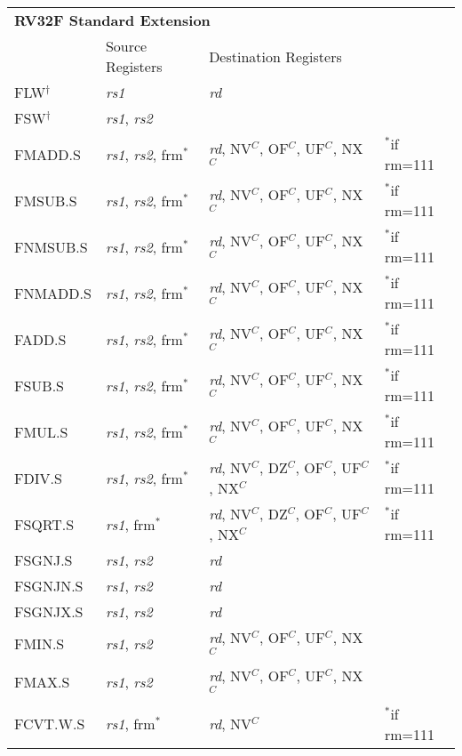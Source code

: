 \begin{tabular}{p{25mm}|p{3cm}|p{6cm}|p{10cm}}
  \multicolumn{4}{l}{\bf RV32F Standard Extension} \\
  \cline{2-3}
   & Source Registers & Destination Registers \\
  \cline{2-3}
   FLW$^\dagger$ & {\em rs1} & {\em rd} &  \\
   \cline{2-3}
   FSW$^\dagger$ & {\em rs1}, {\em rs2} &  &  \\
   \cline{2-3}
   FMADD.S & {\em rs1}, {\em rs2}, frm$^*$ & {\em rd}, NV$^C$, OF$^C$, UF$^C$, NX$^C$ & $^*$if rm=111 \\
   \cline{2-3}
   FMSUB.S & {\em rs1}, {\em rs2}, frm$^*$ & {\em rd}, NV$^C$, OF$^C$, UF$^C$, NX$^C$ & $^*$if rm=111 \\
   \cline{2-3}
   FNMSUB.S & {\em rs1}, {\em rs2}, frm$^*$ & {\em rd}, NV$^C$, OF$^C$, UF$^C$, NX$^C$ & $^*$if rm=111 \\
   \cline{2-3}
   FNMADD.S & {\em rs1}, {\em rs2}, frm$^*$ & {\em rd}, NV$^C$, OF$^C$, UF$^C$, NX$^C$ & $^*$if rm=111 \\
   \cline{2-3}
   FADD.S & {\em rs1}, {\em rs2}, frm$^*$ & {\em rd}, NV$^C$, OF$^C$, UF$^C$, NX$^C$ & $^*$if rm=111 \\
   \cline{2-3}
   FSUB.S & {\em rs1}, {\em rs2}, frm$^*$ & {\em rd}, NV$^C$, OF$^C$, UF$^C$, NX$^C$ & $^*$if rm=111 \\
   \cline{2-3}
   FMUL.S & {\em rs1}, {\em rs2}, frm$^*$ & {\em rd}, NV$^C$, OF$^C$, UF$^C$, NX$^C$ & $^*$if rm=111 \\
   \cline{2-3}
   FDIV.S & {\em rs1}, {\em rs2}, frm$^*$ & {\em rd}, NV$^C$, DZ$^C$, OF$^C$, UF$^C$, NX$^C$ & $^*$if rm=111 \\
   \cline{2-3}
   FSQRT.S & {\em rs1}, frm$^*$ & {\em rd}, NV$^C$, DZ$^C$, OF$^C$, UF$^C$, NX$^C$ & $^*$if rm=111 \\
   \cline{2-3}
   FSGNJ.S & {\em rs1}, {\em rs2} & {\em rd} &  \\
   \cline{2-3}
   FSGNJN.S & {\em rs1}, {\em rs2} & {\em rd} &  \\
   \cline{2-3}
   FSGNJX.S & {\em rs1}, {\em rs2} & {\em rd} &  \\
   \cline{2-3}
   FMIN.S & {\em rs1}, {\em rs2} & {\em rd}, NV$^C$, OF$^C$, UF$^C$, NX$^C$ &  \\
   \cline{2-3}
   FMAX.S & {\em rs1}, {\em rs2} & {\em rd}, NV$^C$, OF$^C$, UF$^C$, NX$^C$ &  \\
   \cline{2-3}
   FCVT.W.S & {\em rs1}, frm$^*$ & {\em rd}, NV$^C$ & $^*$if rm=111 \\

\end{tabular}
